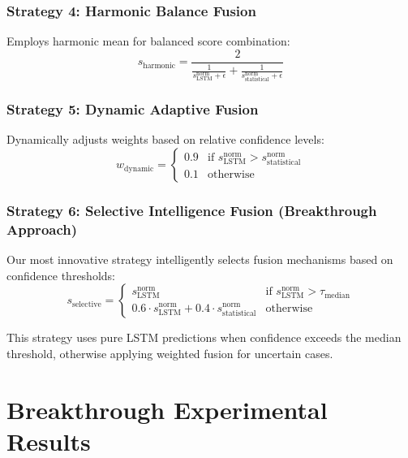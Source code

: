 \documentclass[conference]{IEEEtran}
\begin{document}
\subsubsection{Strategy 4: Harmonic Balance Fusion}
Employs harmonic mean for balanced score combination:
\begin{equation}
s_{\text{harmonic}} = \frac{2}{\frac{1}{s_{\text{LSTM}}^{\text{norm}} + \epsilon} + \frac{1}{s_{\text{statistical}}^{\text{norm}} + \epsilon}}
\end{equation}

\subsubsection{Strategy 5: Dynamic Adaptive Fusion}
Dynamically adjusts weights based on relative confidence levels:
\begin{equation}
w_{\text{dynamic}} = \begin{cases} 
0.9 & \text{if } s_{\text{LSTM}}^{\text{norm}} > s_{\text{statistical}}^{\text{norm}} \\
0.1 & \text{otherwise}
\end{cases}
\end{equation}

\subsubsection{Strategy 6: Selective Intelligence Fusion (Breakthrough Approach)}
Our most innovative strategy intelligently selects fusion mechanisms based on confidence thresholds:
\begin{equation}
s_{\text{selective}} = \begin{cases}
s_{\text{LSTM}}^{\text{norm}} & \text{if } s_{\text{LSTM}}^{\text{norm}} > \tau_{\text{median}} \\
0.6 \cdot s_{\text{LSTM}}^{\text{norm}} + 0.4 \cdot s_{\text{statistical}}^{\text{norm}} & \text{otherwise}
\end{cases}
\end{equation}

This strategy uses pure LSTM predictions when confidence exceeds the median threshold, otherwise applying weighted fusion for uncertain cases.

\section{Breakthrough Experimental Results}
\end{document}
